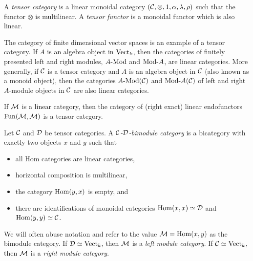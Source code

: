 \documentclass[a4paper]{amsart}
\begin{document}
\begin{definition}
	A {\em tensor category} is a linear monoidal category $(\mathcal C, \otimes, 1, \alpha, \lambda, \rho)$ such that the functor $\otimes$ is multilinear. A {\em tensor functor} is a monoidal functor which is also linear.
\end{definition}

\begin{example}
	The category of finite dimensional vector spaces is an example of a tensor category. If $A$ is an algebra object in $\mathrm{Vect}_k$, then the categories of finitely presented left and right modules, $\Mod{A}{}$ and $\Mod{}{A}$, are linear categories. More generally, if $\mathcal C$ is a tensor category and $A$ is an algebra object in $\mathcal C$ (also known as a monoid object), then the categories $\Mod{A}{}(\cC)$ and $\Mod{}{A}(\cC)$ of left and right $A$-module objects in $\mathcal C$ are also linear categories.
\end{example}

\begin{example}
	If $\mathcal M$ is a linear category, then the category of (right exact) linear endofunctors $\operatorname{Fun}(\mathcal M, \mathcal M)$ is a tensor category. 
\end{example}

\begin{definition} 
	Let $\mathcal C$ and $\mathcal D$ be tensor categories. A {\em $\mathcal C$-$\mathcal D$-bimodule category} is a bicategory with exactly two objects $x$ and $y$ such that 
	\begin{itemize}
		\item all Hom categories are linear categories, 
		\item horizontal composition is multilinear,
		\item the category $\operatorname{Hom}(y,x)$ is empty, and
		\item there are identifications of monoidal categories $\operatorname{Hom}(x,x) \simeq \mathcal D$ and $\operatorname{Hom}(y,y) \simeq \mathcal C$.
	\end{itemize} %
	We will often abuse notation and refer to the value $\mathcal M = \operatorname{Hom}(x,y)$ as the bimodule category. If $\mathcal D \simeq \mathrm{Vect}_k$, then $\mathcal M$ is a {\em left module category}. If $\mathcal C \simeq \mathrm{Vect}_k$, then $\mathcal M$ is a {\em right module category}.
\end{definition}
	
\end{document}
